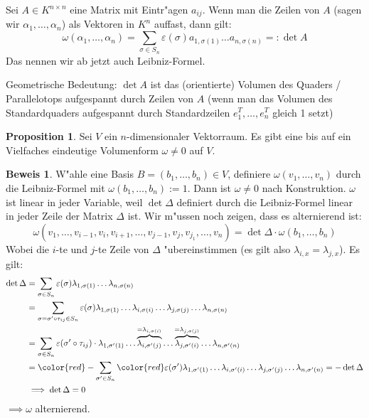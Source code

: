 \documentclass[oneside,fontsize=11pt,paper=a4,BCOR=0mm,DIV=12,automark,headsepline]{scrbook}
\newcommand{\gq}[1]{\glqq{}#1\grqq{}} %
\newcommand{\mcolor}[2][red]{\begingroup\color{#1}#2\endgroup }
\theoremstyle{remark}
\theoremstyle{definition}
\newtheorem*{proposition}{Proposition}
\theoremstyle{definition}
\newtheorem*{prof}{Beweis}
\theoremstyle{remark}
\begin{document}
\begin{definition}{}{}
  Sei \(A\in K^{n\times n}\) eine Matrix mit Eintr"agen \(a_{ij}\). Wenn man die Zeilen von \(A\) (sagen wir \(\alpha_1,\dots, \alpha_n\)) als
  Vektoren in \(K^n\) auffast, dann gilt: \[\omega(\alpha_1,\dots,\alpha_n) = \sum_{\sigma\in S_n}{\varepsilon(\sigma)a_{1,\sigma(1)}\dots a_{n,\sigma(n)}} =: \det A \]
  Das nennen wir ab jetzt auch Leibniz-Formel.
\end{definition}

\begin{relation}
  Geometrische Bedeutung: \(\det A\) ist das (orientierte) Volumen des Quaders / Parallelotops aufgespannt durch Zeilen von \(A\) (wenn man das Volumen des \gq{Standardquaders} aufgespannt durch Standardzeilen \(e_1^T,\dots,e_n^T\) gleich 1 setzt)
\end{relation}
\begin{proposition}
  Sei \(V\) ein \(n\)-dimensionaler Vektorraum. Es gibt eine bis auf ein Vielfaches eindeutige Volumenform \(\omega \neq 0\) auf \(V\).
\end{proposition}
\begin{prof}
  W"ahle eine Basis \(B= (b_1,\dots,b_n) \in V\), definiere \(\omega(v_1,\dots,v_n)\) durch die Leibniz-Formel mit \(\omega(b_1,\dots,b_n):=1\). Dann ist \(\omega\neq 0\) nach Konstruktion. \(\omega\) ist linear in jeder Variable, weil \(\det\Delta \) definiert durch die Leibniz-Formel linear in jeder Zeile der Matrix \(\Delta\) ist. Wir m"ussen noch zeigen, dass es alternierend ist: \[\omega(v_1,\dots,v_{i-1},v_i,v_{i+1},\dots,v_{j-1},v_j,v_{j_1},\dots,v_n) = \det\Delta \cdot\omega(b_1,\dots,b_n) \] Wobei die \(i\)-te und \(j\)-te Zeile von \(\Delta\) "ubereinstimmen (es gilt also \(\lambda_{i,x}=\lambda_{j,x}\)). Es gilt:
  \begin{align*}
    \det\Delta &= \sum_{\sigma\in S_n}\varepsilon(\sigma)\lambda_{1,\sigma(1)}\dots\lambda_{n,\sigma(n)} \\
               &= \sum_{\sigma = \sigma'\circ\tau_{ij}\in S_n}\varepsilon(\sigma)\lambda_{1,\sigma(1)}\dots\lambda_{i,\sigma(i)}\dots\lambda_{j,\sigma(j)}\dots\lambda_{n,\sigma(n)} \\
               &= \sum_{\sigma\in S_n}\varepsilon(\sigma'\circ\tau_{ij})\cdot\lambda_{1,\sigma'(1)}\dots\overbrace{\lambda_{i,\sigma'(j)}}^{=\lambda_{i,\sigma(i)}}\dots\overbrace{\lambda_{j,\sigma'(i)}}^{=\lambda_{j,\sigma(j)}}\dots \lambda_{n,\sigma'(n)} \\
               &= \mcolor{-} \sum_{\sigma'\in S_n} \mcolor{\varepsilon(\sigma')} \lambda_{1,\sigma'(1)}\dots\lambda_{i,\sigma'(i)}\dots\lambda_{j,\sigma'(j)}\dots\lambda_{n,\sigma'(n)} = -\det \Delta \\
               &\implies \det \Delta = 0
  \end{align*}
  \(\implies\omega \) alternierend.
\end{prof}
\end{document}

